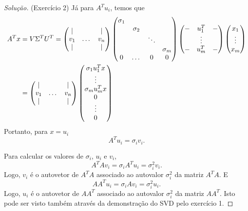 \documentclass[a4paper,10pt]{article}
\newenvironment{solution}
  {\begin{proof}[Solução]}
  {\end{proof}}
\begin{document}
\begin{solution}{(Exercício 2)}
    Já para $A^Tu_i$, temos que
    \begin{equation*}
      \begin{split}
      A^Tx &= V\Sigma^TU^T =
        \begin{pmatrix}
          \vert & & \vert \\
          v_1 & \dots & v_n \\
          \vert & & \vert
        \end{pmatrix}
        \begin{pmatrix}
          \sigma_1 & & &  \\
          &\sigma_2 & &  \\
          & & \ddots &  \\
          & & &\sigma_m \\
          0 & \dots & 0 & 0
        \end{pmatrix}
        \begin{pmatrix}
            \-- & u_1^T & \-- \\
             & \vdots &  \\
            \-- & u_m^T & \--
        \end{pmatrix}
        \begin{pmatrix}
          x_1 \\
          \vdots \\
          x_m
        \end{pmatrix} \\
        &= \begin{pmatrix}
            \vert & & \vert \\
            v_1 & \dots & v_n \\
            \vert & & \vert
          \end{pmatrix}
          \begin{pmatrix}
          \sigma_1u_1^Tx \\
          \vdots \\
          \sigma_mu_m^Tx \\
          0 \\
          \vdots \\
          0
        \end{pmatrix}
      \end{split}
    \end{equation*}
    Portanto, para $x=u_i$
    \begin{equation*}
      A^Tu_i = \sigma_i v_i.
    \end{equation*}

    Para calcular os valores de $\sigma_i$, $u_i$ e $v_i$,
    \begin{equation*}
      A^TAv_i = \sigma_iA^Tu_i = \sigma_i^2v_i.
    \end{equation*}
    Logo, $v_i$ é o autovetor de $A^TA$ associado ao autovalor $\sigma_i^2$ da matriz
    $A^TA$. E
    \begin{equation*}
      AA^Tu_i = \sigma_iAv_i = \sigma_i^2u_i.
    \end{equation*}
    Logo, $u_i$ é o autovetor de $AA^T$ associado ao autovalor $\sigma_i^2$ da matriz
    $AA^T$. Isto pode ser visto também através da demonstração do SVD pelo exercício 1.
  \end{solution}
\end{document}
